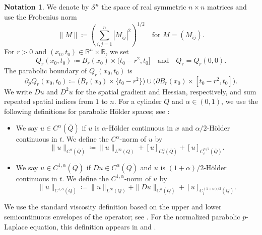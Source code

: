 \documentclass[a4paper,11pt]{amsart}
\theoremstyle{plain}
\theoremstyle{definition}
\newtheorem*{notation}{Notation}
\numberwithin{equation}{section}
\begin{document}
\begin{notation}
We denote by $\mathcal{S}^n$ the space of real symmetric $n\times n$ matrices and use the Frobenius norm
\begin{equation*}
 \|M\|\coloneqq\left(\sum_{i,j=1}^n|M_{ij}|^2\right)^{1/2} \quad \text{for $M=(M_{ij})$}.
\end{equation*}
For $r>0$ and $(x_0,t_0)\in\mathbb R^n\times\mathbb R$, we set
\begin{equation*}
 Q_r(x_0,t_0)\coloneqq B_r(x_0)\times(t_0-r^2,t_0] \quad \text{and} \quad Q_r=Q_r(0,0). 
\end{equation*}
The parabolic boundary of $Q_r(x_0,t_0)$ is
\begin{equation*}
 \partial_pQ_r(x_0,t_0)
 \coloneqq\bigl(\overline{B}_r(x_0)\times\{t_0-r^2\}\bigr)
 \cup\bigl(\partial B_r(x_0)\times[t_0-r^2,t_0]\bigr).
\end{equation*}
We write $Du$ and $D^2u$ for the spatial gradient and Hessian, respectively, and sum repeated spatial indices from $1$ to $n$. 
For a cylinder $Q$ and $\alpha\in(0,1)$, we use the following definitions for parabolic H\"older spaces; see \cite{IS13book}:
\begin{itemize}
 \item We say $u\in C^\alpha(\overline{Q})$ if $u$ is $\alpha$-H\"older continuous in $x$ and $\alpha/2$-H\"older continuous in $t$. We define the $C^{\alpha}$-norm of $u$ by
\begin{equation*}
    \|u\|_{C^\alpha(\overline{Q})}\coloneqq \|u\|_{L^\infty(Q)} + [u]_{C_x^\alpha(\overline{Q})} + [u]_{C_t^{\alpha/2}(\overline{Q})}.
\end{equation*}
 \item We say $u\in C^{1,\alpha}(\overline{Q})$ if $Du \in C^{\alpha}(\overline Q)$ and $u$ is $(1+\alpha)/2$-H\"older continuous in $t$. We define the $C^{1,\alpha}$-norm of $u$ by
\begin{equation*}
    \|u\|_{C^{1,\alpha}(\overline{Q})}\coloneqq \|u\|_{L^\infty(Q)} + \|Du\|_{C^{\alpha}(\overline{Q})} + [u]_{C_t^{(1+\alpha)/2}(\overline{Q})}.
\end{equation*}
\end{itemize}
\end{notation}

We use the standard viscosity definition based on the upper and lower semicontinuous envelopes of the operator; see \cite{CIL92}. For the normalized parabolic $p$-Laplace equation, this definition appears in \cite[Definition~2.1]{MPR10b} and \cite[Definition~2.1]{AP18}. 
\end{document}
